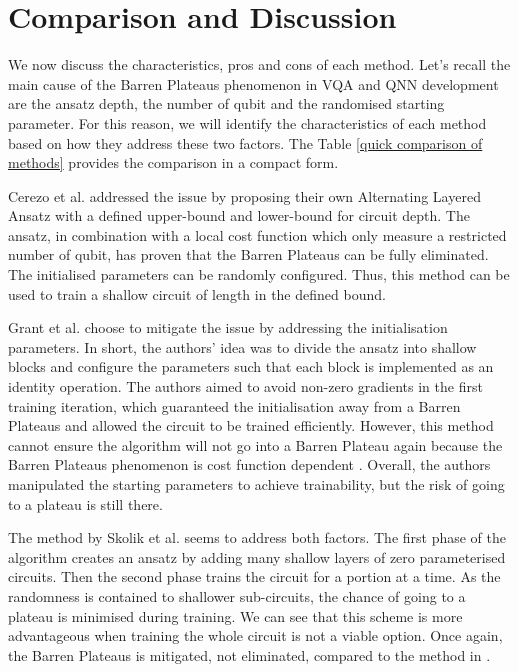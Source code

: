 \section{Comparison and Discussion}
We now discuss the characteristics, pros and cons of each method.
Let's recall the main cause of the Barren Plateaus phenomenon in VQA and QNN development are the ansatz depth, the number of qubit and the randomised starting parameter.
For this reason, we will identify the characteristics of each method based on how they address these two factors.
The Table \ref{quick comparison of methods} provides the comparison in a compact form.

Cerezo et al. \cite{cerezoCostFunctionDependent2021} addressed the issue by proposing their own Alternating Layered Ansatz with a defined upper-bound and lower-bound for circuit depth.
The ansatz, in combination with a local cost function which only measure a restricted number of qubit, has proven that the Barren Plateaus can be fully eliminated. 
The initialised parameters can be randomly configured.
Thus, this method can be used to train a shallow circuit of length in the defined bound. 

Grant et al. \cite{grantInitializationStrategyAddressing2019} choose to mitigate the issue by addressing the initialisation parameters. 
In short, the authors' idea was to divide the ansatz into shallow blocks and configure the parameters such that each block is implemented as an identity operation.
The authors aimed to avoid non-zero gradients in the first training iteration, which guaranteed the initialisation away from a Barren Plateaus and allowed the circuit to be trained efficiently.
However, this method cannot ensure the algorithm will not go into a Barren Plateau again because the Barren Plateaus phenomenon is cost function dependent \cite{cerezoCostFunctionDependent2021}.
Overall, the authors manipulated the starting parameters to achieve trainability, but the risk of going to a plateau is still there.

The method by Skolik et al. \cite{skolikLayerwiseLearningQuantum2021} seems to address both factors.
The first phase of the algorithm creates an ansatz by adding many shallow layers of zero parameterised circuits. 
Then the second phase trains the circuit for a portion at a time.
As the randomness is contained to shallower sub-circuits, the chance of going to a plateau is minimised during training.
We can see that this scheme is more advantageous when training the whole circuit is not a viable option. 
Once again, the Barren Plateaus is mitigated, not eliminated, compared to the method in \cite{cerezoCostFunctionDependent2021}.


